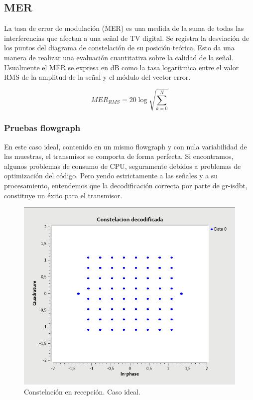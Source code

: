 \subsection{MER}
La tasa de error de modulación (MER) es una medida de la suma de todas las interferencias que afectan a una señal de TV digital. Se registra la desviación de los puntos del diagrama de constelación de su posición teórica. Esto da una manera de realizar una evaluación cuantitativa sobre la calidad de la señal. Usualmente el MER se expresa en dB como la tasa logarítmica entre el valor RMS de la amplitud de la señal y el módulo del vector error.


\begin{equation}
MER_{RMS} = 20 \log \sqrt{\sum_{k=0}^N}
\end{equation}

\subsubsection{Pruebas flowgraph}

En este caso ideal, contenido en un mismo flowgraph y con nula variabilidad de las muestras, el transmisor se comporta de forma perfecta. Si encontramos, algunos problemas de consumo de CPU, seguramente debidos a problemas de optimización del código. 
Pero yendo estrictamente a las señales y a su procesamiento, entendemos que la decodificación correcta por parte de gr-isdbt, constituye un éxito para el transmisor. 

\begin{figure}[!h]
	\centering
	\includegraphics[scale=0.5]{figuras/cap06/const_rec}
	\caption{\label{f:const_rec} Constelación en recepción. Caso ideal.}
\end{figure}

